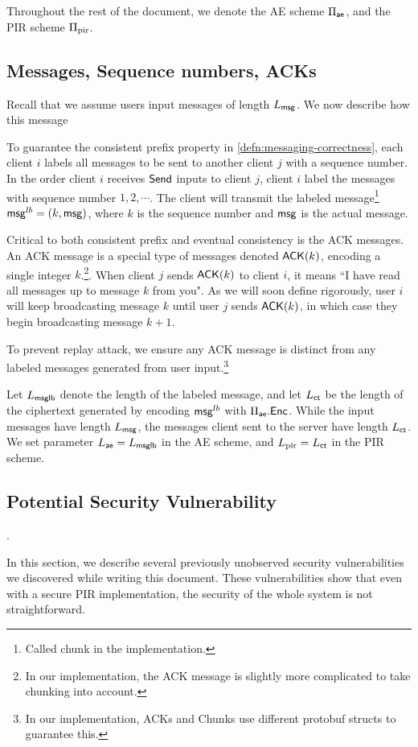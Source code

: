 Throughout the rest of the document, we denote the AE scheme $\Pi_{\mathsf{ae}}$, and the PIR scheme $\Pi_{\text{pir}}$.
\subsection{Messages, Sequence numbers, ACKs}
Recall that we assume users input messages of length $L_{\mathsf{msg}}$. We now describe how this message 

To guarantee the consistent prefix property in \cref{defn:messaging-correctness}, each client $i$ labels all messages to be sent to another client $j$ with a sequence number. In the order client $i$ receives $\mathsf{Send}$ inputs to client $j$, client $i$ label the messages with sequence number $1,2,\cdots$. The client will transmit the labeled message\footnote{Called chunk in the implementation.} $\mathsf{msg}^{lb} = (k, \mathsf{msg})$, where $k$ is the sequence number and $\mathsf{msg}$ is the actual message. 

Critical to both consistent prefix and eventual consistency is the ACK messages. An ACK message is a special type of messages denoted $\mathsf{ACK}(k)$, encoding a single integer $k$.\footnote{In our implementation, the ACK message is slightly more complicated to take chunking into account.}. When client $j$ sends $\mathsf{ACK}(k)$ to client $i$, it means ``I have read all messages up to message $k$ from you". As we will soon define rigorously, user $i$ will keep broadcasting message $k$ until user $j$ sends $\mathsf{ACK}(k)$, in which case they begin broadcasting message $k + 1$. 

To prevent replay attack, we ensure any ACK message is distinct from any labeled messages generated from user input.\footnote{In our implementation, ACKs and Chunks use different protobuf structs to guarantee this.}

Let $L_{\mathsf{msglb}}$ denote the length of the labeled message, and let $L_{\mathsf{ct}}$ be the length of the ciphertext generated by encoding $\mathsf{msg}^{lb}$ with $\Pi_{\mathsf{ae}}.\mathsf{Enc}$. While the input messages have length $L_{\mathsf{msg}}$, the messages client sent to the server have length $L_{\mathsf{ct}}$. We set parameter $L_{\mathsf{ae}} = L_{\mathsf{msglb}}$ in the AE scheme, and $L_{\text{pir}} = L_{\mathsf{ct}}$ in the PIR scheme.
\subsection{Potential Security Vulnerability}
\label{subsec:security-vulnerable}
.

In this section, we describe several previously unobserved security vulnerabilities we discovered while writing this document. These vulnerabilities show that even with a secure PIR implementation, the security of the whole system is not straightforward.

